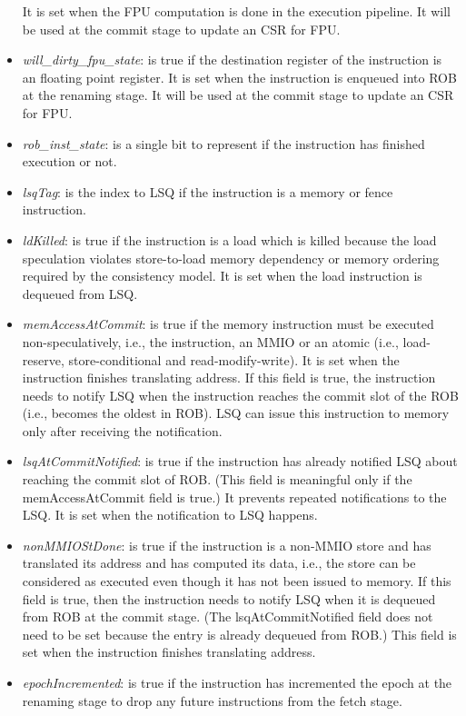 \begin{itemize}
    It is set when the FPU computation is done in the execution pipeline.
    It will be used at the commit stage to update an CSR for FPU.
    \item \emph{will\_dirty\_fpu\_state}: is true if the destination register of the instruction is an floating point register.
    It is set when the instruction is enqueued into ROB at the renaming stage.
    It will be used at the commit stage to update an CSR for FPU.
    \item \emph{rob\_inst\_state}: is a single bit to represent if the instruction has finished execution or not.
    \item \emph{lsqTag}: is the index to LSQ if the instruction is a memory or fence instruction.
    \item \emph{ldKilled}: is true if the instruction is a load which is killed because the load speculation violates store-to-load memory dependency or memory ordering required by the consistency model.
    It is set when the load instruction is dequeued from LSQ.
    \item \emph{memAccessAtCommit}: is true if the memory instruction must be executed non-speculatively, i.e., the instruction, an MMIO or an atomic (i.e., load-reserve, store-conditional and read-modify-write).
    It is set when the instruction finishes translating address.
    If this field is true, the instruction needs to notify LSQ when the instruction reaches the commit slot of the ROB (i.e., becomes the oldest in ROB).
    LSQ can issue this instruction to memory only after receiving the notification.
    \item \emph{lsqAtCommitNotified}: is true if the instruction has already notified LSQ about reaching the commit slot of ROB.
    (This field is meaningful only if the memAccessAtCommit field is true.)
    It prevents repeated notifications to the LSQ.
    It is set when the notification to LSQ happens.
    \item \emph{nonMMIOStDone}: is true if the instruction is a non-MMIO store and has translated its address and has computed its data, i.e., the store can be considered as executed even though it has not been issued to memory.
    If this field is true, then the instruction needs to notify LSQ when it is dequeued from ROB at the commit stage.
    (The lsqAtCommitNotified field does not need to be set because the entry is already dequeued from ROB.)
    This field is set when the instruction finishes translating address.
    \item \emph{epochIncremented}: is true if the instruction has incremented the epoch at the renaming stage to drop any future instructions from the fetch stage.

\end{itemize}

